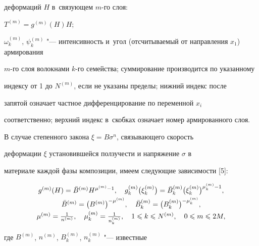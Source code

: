 деформаций $H$ в~связующем $m$-го слоя:

$T^{(m)} = g^{(m)}( H )H$; 

$\omega _k^{(m)} $, $\psi _k^{(m)} $ "--- интенсивность и~угол (отсчитываемый от направления $x_1$) армирования 

$m$-го слоя волокнами $k$-го семейства; суммирование производится по указанному 

индексу от 1 до $N^{(m)}$, если не указаны пределы; нижний индекс после 

запятой означает частное дифференцирование по переменной $x_i $ 

соответственно; верхний индекс в~скобках означает номер армированного слоя.



В случае степенного закона $\xi = B\sigma ^n$, связывающего скорость 

деформации $\xi $ установившейся ползучести и напряжение $\sigma $ в 

материале каждой фазы композиции, имеем следующие зависимости [5]:

\begin{equation}

\label{nemir:eq6}

\begin{array}{c}

g^{(m)}(H) = \bar {B}^{(m)}H^{\mu ^{(m)} -1},\quad

g_k^{(m)} \bigl( \xi _k^{(m)} \bigr) = \bar {B}_k^{(m)} \bigl( \xi _k^{(m)}  \bigr)^{\mu _k^{(m)} - 1},\vspace{1mm}\\

\bar {B}^{(m)} = \bigl( B^{(m)} \bigr)^{-\mu^{(m)}}, \quad 

\bar {B}_k^{(m)} = \bigl( B_k^{(m)} \bigr)^{ - \mu _k^{(m)}},\vspace{1mm}\\

\mu^{(m)} = \frac1 {n^{(m)}},\quad 

\mu_k^{(m)} = \frac1{n_k^{(m)} },\quad 

1 \leqslant k \leqslant N^{(m)},\quad 

0 \leqslant m \leqslant 2M, 

\end{array}

\end{equation}

где $B^{(m)}$, $n^{(m)}$, $B_k^{(m)}$, $n_k^{(m)} $ "--- известные 


